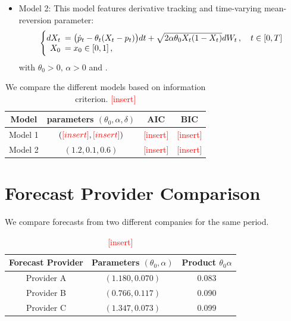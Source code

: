 \documentclass[11pt]{article}
\theoremstyle{definition}
\newcommand{\add}{\textcolor{red}{[insert]}}
\begin{document}
\begin{itemize}
  \item Model 2: This model features derivative tracking and time-varying mean-reversion parameter:  
\begin{equation}
  \left\{
  \begin{array}{@{}rl@{}}
    dX_t \!\!\!&= \big(\dot{p}_t  - \theta_t (X_t - p_t) \big) dt +\sqrt{2 \alpha \theta_0 X_t (1 - X_t)} dW_t\,, \quad t \in [0,T]  \\
   X_0  \!\!\!&=  x_0\in [0,1] \,,
 \end{array}\right.  \label{Model2}
\end{equation}
 with $\theta_0 > 0, \, \alpha > 0$ and .
\end{itemize}

\begin{table}[H]
\centering
\begin{tabular}{cccc}
\toprule
Model   &  parameters $(\theta_0, \alpha,\delta)$   & AIC & BIC \\ \midrule
Model 1 &  $(\add,\add) $    &  \add   &  \add   \\
Model 2 &   $(1.2,0.1,0.6)$   &  \add   &   \add    \\ 
\bottomrule
\end{tabular}
\caption{We compare the different models based on information criterion. \add }
\label{tab:model_comparison}
\end{table}

\section{Forecast Provider Comparison} \label{Section_6}
We compare forecasts from two different companies for the same period.
\begin{table}[H]
\centering
\begin{tabular}{ccc}
\toprule
Forecast Provider & Parameters $(\theta_0, \alpha)$ & Product $\theta_0\alpha$ \\ \midrule
Provider A  &  $(1.180,0.070)$      &  0.083    \\
Provider B  & $(0.766,0.117) $  &  0.090 \\ 
Provider C  & $(1.347,0.073) $  &  0.099 \\ 
\bottomrule
\end{tabular}
\caption{\add}
\label{tab:forcast_comparison}
\end{table}
\end{document}

